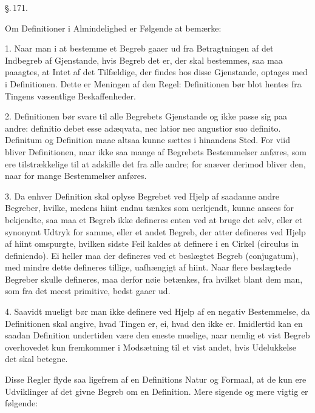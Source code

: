 \documentclass[12pt]{book}
\def\textit#1{#1}%
\newcommand{\parag}[1]{%
  \par\vspace{0.9\baselineskip}%
  {\centering\textit{\S.\,#1.}\par}%
  \vspace{0.35\baselineskip}%
  \noindent\hspace{\parindent}\ignorespaces
}
\newcommand{\opage}[1]{\marginnote{\footnotesize\textit{[#1]}}}
\begin{document}
\parag{171}

Om Definitioner i Almindelighed er Følgende at bemærke:

1. Naar man i at bestemme et Begreb gaaer ud fra Betragtningen af det Indbegreb
af Gjenstande, hvis Begreb det er, der skal bestemmes, saa maa paaagtes, at
Intet af det Tilfældige, der findes hos disse Gjenstande, optages med i
Definitionen. Dette er Meningen af den Regel: Definitionen bør blot hentes fra
Tingens væsentlige Beskaffenheder.

2. Definitionen bør svare til alle Begrebets Gjenstande og ikke passe sig paa
andre: \textit{definitio debet esse adæqvata, nec latior nec angustior suo
definito}. Definitum og Definition maae altsaa kunne sættes i hinandens Sted.
For viid bliver Definitionen, naar ikke saa mange af Begrebets Bestemmelser
anføres, som ere tilstrækkelige til at adskille det fra alle andre; for snæver
derimod bliver den, naar for mange Bestemmelser anføres.

3. Da enhver Definition skal oplyse Begrebet ved Hjelp af saadanne andre
Begreber, hvilke, medens hiint endnu tænkes som uerkjendt, kunne ansees for
bekjendte, saa maa et Begreb ikke defineres enten ved at bruge det selv, eller
et synonymt Udtryk for samme, eller et andet Begreb, der atter defineres ved
Hjelp af hiint omspurgte,
\opage{371} %
hvilken sidste Feil kaldes at definere i en Cirkel
(\textit{circulus in definiendo}). Ei heller maa der defineres ved et
beslægtet Begreb (\textit{conjugatum}), med mindre dette defineres tillige,
uafhængigt af hiint. Naar flere beslægtede Begreber skulle defineres, maa
derfor nøie betænkes, fra hvilket blant dem man, som fra det meest primitive,
bedst gaaer ud.

4. Saavidt mueligt bør man ikke definere ved Hjelp af en negativ
Bestemmelse, da Definitionen skal angive, hvad Tingen er, ei, hvad den ikke
er. Imidlertid kan en saadan Definition undertiden være den eneste muelige,
naar nemlig et vist Begreb overhovedet kun fremkommer i Modsætning til et
vist andet, hvis Udelukkelse det skal betegne.

Disse Regler flyde saa ligefrem af en Definitions Natur og Formaal, at de
kun ere Udviklinger af det givne Begreb om en Definition. Mere sigende og
mere vigtig er følgende:
\end{document}
